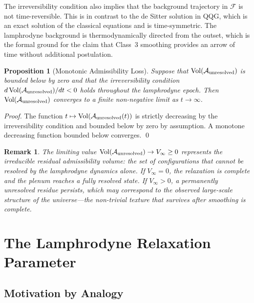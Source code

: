 \documentclass[12pt, a4paper]{article}
\newtheorem{proposition}{Proposition}
\newtheorem{remark}{Remark}
\newcommand{\calA}{\mathcal{A}}
\newcommand{\calF}{\mathcal{F}}
\newcommand{\Vol}{\operatorname{Vol}}
\begin{document}
The irreversibility condition also implies that the background trajectory in $\calF$
is not time-reversible. This is in contrast to the de Sitter solution in QQG, which
is an exact solution of the classical equations and is time-symmetric. The
lamphrodyne background is thermodynamically directed from the outset, which is the
formal ground for the claim that Class~3 smoothing provides an arrow of time
without additional postulation.

\begin{proposition}[Monotonic Admissibility Loss]
Suppose that $\Vol(\calA_{\rm unresolved})$ is bounded below by zero and that the
irreversibility condition $d\Vol(\calA_{\rm unresolved})/dt < 0$ holds throughout
the lamphrodyne epoch. Then $\Vol(\calA_{\rm unresolved})$ converges to a finite
non-negative limit as $t \to \infty$.
\end{proposition}

\begin{proof}
The function $t \mapsto \Vol(\calA_{\rm unresolved}(t))$ is strictly decreasing by
the irreversibility condition and bounded below by zero by assumption. A monotone
decreasing function bounded below converges. \qed
\end{proof}

\begin{remark}
The limiting value $\Vol(\calA_{\rm unresolved}) \to V_\infty \geq 0$ represents
the irreducible residual admissibility volume: the set of configurations that cannot
be resolved by the lamphrodyne dynamics alone. If $V_\infty = 0$, the relaxation is
complete and the plenum reaches a fully resolved state. If $V_\infty > 0$, a
permanently unresolved residue persists, which may correspond to the observed
large-scale structure of the universe---the non-trivial texture that survives after
smoothing is complete.
\end{remark}

\section{The Lamphrodyne Relaxation Parameter}
\label{sec:etalamph}

\subsection{Motivation by Analogy}
\end{document}
